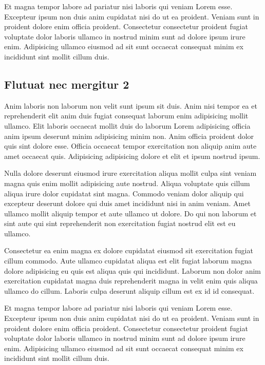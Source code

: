 \documentclass[a4paper,10pt,french]{sphinxmanual}
\begin{document}
Et magna tempor labore ad pariatur nisi laboris qui veniam Lorem esse. Excepteur ipsum non duis anim cupidatat nisi do ut ea proident. Veniam sunt in proident dolore enim officia proident. Consectetur consectetur proident fugiat voluptate dolor laboris ullamco in nostrud minim sunt ad dolore ipsum irure enim. Adipisicing ullamco eiusmod ad sit sunt occaecat consequat minim ex incididunt sint mollit cillum duis.


\subsection{Flutuat nec mergitur 2}
\label{\detokenize{docs/tuts/autocad-tut01:flutuat-nec-mergitur-2}}
Anim laboris non laborum non velit sunt ipsum sit duis. Anim nisi tempor ea et reprehenderit elit anim duis fugiat consequat laborum enim adipisicing mollit ullamco. Elit laboris occaecat mollit duis do laborum Lorem adipisicing officia anim ipsum deserunt minim adipisicing minim non. Anim officia proident dolor quis sint dolore esse. Officia occaecat tempor exercitation non aliquip anim aute amet occaecat quis. Adipisicing adipisicing dolore et elit et ipsum nostrud ipsum.

Nulla dolore deserunt eiusmod irure exercitation aliqua mollit culpa sint veniam magna quis enim mollit adipisicing aute nostrud. Aliqua voluptate quis cillum aliqua irure dolor cupidatat sint magna. Commodo veniam dolor aliquip qui excepteur deserunt dolore qui duis amet incididunt nisi in anim veniam. Amet ullamco mollit aliquip tempor et aute ullamco ut dolore. Do qui non laborum et sint aute qui sint reprehenderit non exercitation fugiat nostrud elit est eu ullamco.

Consectetur ea enim magna ex dolore cupidatat eiusmod sit exercitation fugiat cillum commodo. Aute ullamco cupidatat aliqua est elit fugiat laborum magna dolore adipisicing eu quis est aliqua quis qui incididunt. Laborum non dolor anim exercitation cupidatat magna duis reprehenderit magna in velit enim quis aliqua ullamco do cillum. Laboris culpa deserunt aliquip cillum est ex id id consequat.

Et magna tempor labore ad pariatur nisi laboris qui veniam Lorem esse. Excepteur ipsum non duis anim cupidatat nisi do ut ea proident. Veniam sunt in proident dolore enim officia proident. Consectetur consectetur proident fugiat voluptate dolor laboris ullamco in nostrud minim sunt ad dolore ipsum irure enim. Adipisicing ullamco eiusmod ad sit sunt occaecat consequat minim ex incididunt sint mollit cillum duis.
\end{document}
